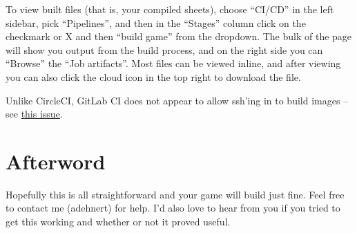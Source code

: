 \documentclass[green]{testgame}
\begin{document}
To view built files (that is, your compiled sheets), choose ``CI/CD'' in the left sidebar, pick ``Pipelines'', and then in the ``Stages'' column click on the checkmark or X and then ``build game'' from the dropdown. The bulk of the page will show you output from the build process, and on the right side you can ``Browse'' the ``Job artifacts''. Most files can be viewed inline, and after viewing you can also click the cloud icon in the top right to download the file.

Unlike CircleCI, GitLab CI does not appear to allow ssh'ing in to build images -- see \href{https://gitlab.com/gitlab-org/gitlab-ce/issues/22319}{this issue}.

\section{Afterword}

Hopefully this is all straightforward and your game will build just fine. Feel free to contact me (adehnert) for help. I'd also love to hear from you if you tried to get this working and whether or not it proved useful.
\end{document}
